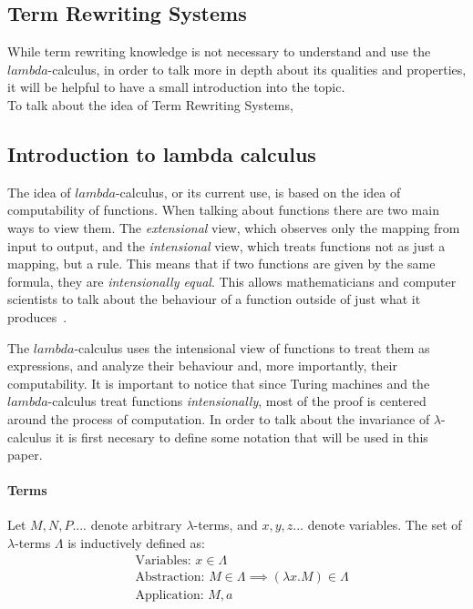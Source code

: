 \documentclass[12pt]{article}
\begin{document}
\subsection{Term Rewriting Systems}\label{intro-trs}
While term rewriting knowledge is not necessary to understand and use the $lambda$-calculus, in order to talk more in depth about its qualities and properties, it will be helpful to have a small introduction into the topic. \\
To talk about the idea of Term Rewriting Systems,
\subsection{Introduction to lambda calculus}\label{intro-lambda}
The idea of $lambda$-calculus, or its current use, is based on the idea of computability of functions. When talking about functions there are two main ways to view them. The \textit{extensional} view, which observes only the mapping from input to output, and the \textit{intensional} view, which treats functions not as just a mapping, but a rule. This means that if two functions are given by the same formula, they are \textit{intensionally equal}. This allows mathematicians and computer scientists to talk about the behaviour of a function outside of just what it produces~\cite{selinger}.

The $lambda$-calculus uses the intensional view of functions to treat them as expressions, and analyze their behaviour and, more importantly, their computability. It is important to notice that since Turing machines and the $lambda$-calculus treat functions \textit{intensionally}, most of the proof is centered around the process of computation.
In order to talk about the invariance of $\lambda$-calculus it is first necesary to define some notation that will be used in this paper.
\paragraph{Terms} Let $M, N, P....$ denote arbitrary $\lambda$-terms, and $x,y,z...$ denote variables. The set of $\lambda$-terms $\Lambda$ is inductively defined as:
\begin{equation}
  \begin{split}
  & \text{Variables: } x \in \Lambda \\
  & \text{Abstraction: } M \in \Lambda \implies ( \lambda x.M ) \in \Lambda \\
  & \text{Application: } M, a
  \end{split}
\end{equation}
\end{document}
